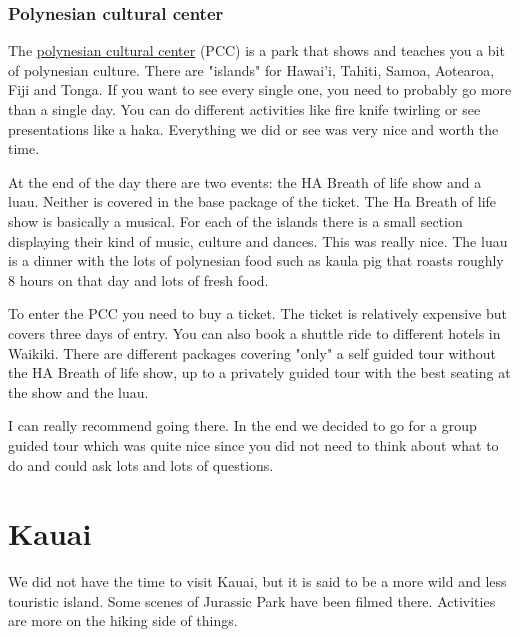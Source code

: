 \documentclass[11pt,a4paper,sans,english]{article}
\begin{document}
\subsubsection{Polynesian cultural center}
The \href{https://polynesia.com/villages/}{polynesian cultural center} (PCC) is a park that shows and teaches you a bit of polynesian culture. There are "islands" for Hawai'i, Tahiti, Samoa, Aotearoa, Fiji and Tonga. If you want to see every single one, you need to probably go more than a single day. You can do different activities like fire knife twirling or see presentations like a haka. Everything we did or see was very nice and worth the time.

At the end of the day there are two events: the HA Breath of life show and a luau. Neither is covered in the base package of the ticket.
The Ha Breath of life show is basically a musical. For each of the islands there is a small section displaying their kind of music, culture and dances. This was really nice.
The luau is a dinner with the lots of polynesian food such as kaula pig that roasts roughly 8 hours on that day and lots of fresh food.

To enter the PCC you need to buy a ticket. The ticket is relatively expensive but covers three days of entry. You can also book a shuttle ride to different hotels in Waikiki. There are different packages covering "only" a self guided tour without the HA Breath of life show, up to a privately guided tour with the best seating at the show and the luau. 

I can really recommend going there.
In the end we decided to go for a group guided tour which was quite nice since you did not need to think about what to do and could ask lots and lots of questions. 

\section{Kauai}
We did not have the time to visit Kauai, but it is said to be a more wild and less touristic island. Some scenes of Jurassic Park have been filmed there. Activities are more on the hiking side of things.
\end{document}
